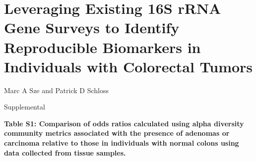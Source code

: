 \documentclass[12pt,]{article}
\title{}
\author{}
\date{}
\begin{document}
\section{Leveraging Existing 16S rRNA Gene Surveys to Identify
Reproducible Biomarkers in Individuals with Colorectal
Tumors}\label{leveraging-existing-16s-rrna-gene-surveys-to-identify-reproducible-biomarkers-in-individuals-with-colorectal-tumors}

\vspace{10mm}

\begin{center}
Marc A Sze and Patrick D Schloss

\vspace{10mm}

Supplemental
\end{center}

\newpage

\textbf{Table S1: Comparison of odds ratios calculated using alpha
diversity community metrics associated with the presence of adenomas or
carcinoma relative to those in individuals with normal colons using data
collected from tissue samples.}

\footnotesize
\end{document}
